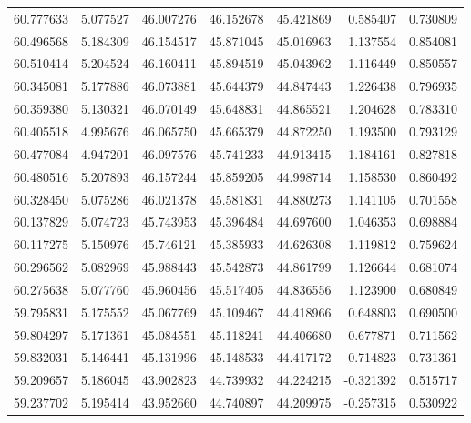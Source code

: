 \begin{tabular}{rrrrrrr}
 60.777633 &   5.077527 &         46.007276 &         46.152678 &         45.421869 &  0.585407 &  0.730809 \\
 60.496568 &   5.184309 &         46.154517 &         45.871045 &         45.016963 &  1.137554 &  0.854081 \\
 60.510414 &   5.204524 &         46.160411 &         45.894519 &         45.043962 &  1.116449 &  0.850557 \\
 60.345081 &   5.177886 &         46.073881 &         45.644379 &         44.847443 &  1.226438 &  0.796935 \\
 60.359380 &   5.130321 &         46.070149 &         45.648831 &         44.865521 &  1.204628 &  0.783310 \\
 60.405518 &   4.995676 &         46.065750 &         45.665379 &         44.872250 &  1.193500 &  0.793129 \\
 60.477084 &   4.947201 &         46.097576 &         45.741233 &         44.913415 &  1.184161 &  0.827818 \\
 60.480516 &   5.207893 &         46.157244 &         45.859205 &         44.998714 &  1.158530 &  0.860492 \\
 60.328450 &   5.075286 &         46.021378 &         45.581831 &         44.880273 &  1.141105 &  0.701558 \\
 60.137829 &   5.074723 &         45.743953 &         45.396484 &         44.697600 &  1.046353 &  0.698884 \\
 60.117275 &   5.150976 &         45.746121 &         45.385933 &         44.626308 &  1.119812 &  0.759624 \\
 60.296562 &   5.082969 &         45.988443 &         45.542873 &         44.861799 &  1.126644 &  0.681074 \\
 60.275638 &   5.077760 &         45.960456 &         45.517405 &         44.836556 &  1.123900 &  0.680849 \\
 59.795831 &   5.175552 &         45.067769 &         45.109467 &         44.418966 &  0.648803 &  0.690500 \\
 59.804297 &   5.171361 &         45.084551 &         45.118241 &         44.406680 &  0.677871 &  0.711562 \\
 59.832031 &   5.146441 &         45.131996 &         45.148533 &         44.417172 &  0.714823 &  0.731361 \\
 59.209657 &   5.186045 &         43.902823 &         44.739932 &         44.224215 & -0.321392 &  0.515717 \\
 59.237702 &   5.195414 &         43.952660 &         44.740897 &         44.209975 & -0.257315 &  0.530922 \\

\end{tabular}
